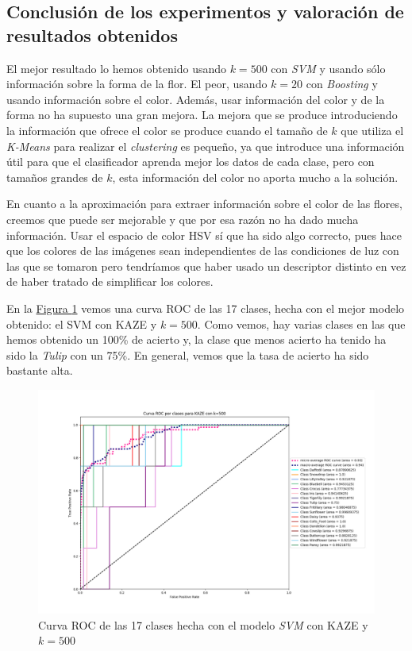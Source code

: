 \documentclass[paper=a4, fontsize=11pt]{article} %
\numberwithin{equation}{section} %
\numberwithin{figure}{section} %
\numberwithin{table}{section} %
\begin{document}
\subsection{Conclusión de los experimentos y valoración de resultados obtenidos}
El mejor resultado lo hemos obtenido usando $k=500$ con \textit{SVM} y usando sólo información sobre la forma de la flor. El peor, usando $k=20$ con \textit{Boosting} y usando información sobre el color. Además, usar información del color y de la forma no ha supuesto una gran mejora. La mejora que se produce introduciendo la información que ofrece el color se produce cuando el tamaño de $k$ que utiliza el \textit{K-Means} para realizar el \textit{clustering} es pequeño, ya que introduce una información útil para que el clasificador aprenda mejor los datos de cada clase, pero con tamaños grandes de $k$, esta información del color no aporta mucho a la solución.

En cuanto a la aproximación para extraer información sobre el color de las flores, creemos que puede ser mejorable y que por esa razón no ha dado mucha información. Usar el espacio de color HSV sí que ha sido algo correcto, pues hace que los colores de las imágenes sean independientes de las condiciones de luz con las que se tomaron pero tendríamos que haber usado un descriptor distinto en vez de haber tratado de simplificar los colores.

En la \hyperref[roc]{Figura \ref*{roc}} vemos una curva ROC de las 17 clases, hecha con el mejor modelo obtenido: el SVM con KAZE y $k=500$. Como vemos, hay varias clases en las que hemos obtenido un 100\% de acierto y, la clase que menos acierto ha tenido ha sido la \textit{Tulip} con un 75\%. En general, vemos que la tasa de acierto ha sido bastante alta.

\begin{figure}[!h]
  \centering
  \includegraphics[width=\textwidth]{img/shapekaze_500}
  \caption{Curva ROC de las 17 clases hecha con el modelo \textit{SVM} con KAZE y $k=500$}
  \label{roc}
\end{figure}

\end{document}

